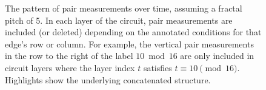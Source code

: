 \documentclass[onecolumn,unpublished,a4paper]{quantumarticle}
\theoremstyle{definition}
\theoremstyle{definition}
\theoremstyle{definition}
\begin{document}
\begin{figure}[H]
    \centering
    \caption{
        The pattern of pair measurements over time, assuming a fractal pitch of 5.
        In each layer of the circuit, pair measurements are included (or deleted) depending on the annotated conditions for that edge's row or column.
        For example, the vertical pair measurements in the row to the right of the label $10 \bmod 16$ are only included in circuit layers where the layer index $t$ satisfies $t \equiv 10 \pmod{16}$.
        Highlights show the underlying concatenated structure.
    }
    \label{fig:cut_pattern}
\end{figure}
\end{document}
